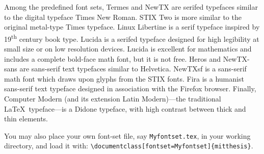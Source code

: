 \documentclass[11pt]{article}
\begin{document}
Among the predefined font sets, Termes and NewTX are serifed typefaces similar to the digital typeface Times New Roman.  STIX Two is more similar to the original metal-type Times typeface. Linux Libertine is a serif typeface inspired by 19\textsuperscript{th} century book type. Lucida is a serifed typeface designed for high legibility at small size or on low resolution devices. Lucida is excellent for mathematics and includes a complete bold-face math font, but it is not free. Heros and NewTX-sans are sans-serif text typefaces similar to Helvetica. NewTXsf is a sans-serif math font which draws upon glyphs from the STIX fonts. Fira is a humanist sans-serif text typeface designed in association with the Firefox browser. Finally, Computer Modern (and its extension Latin Modern)---the traditional \LaTeX\ typeface---is a Didone typeface, with high contrast between thick and thin elements.   

You may also place your own font-set file, say \texttt{Myfontset.tex}, in your working directory, and load it with:
\verb|\documentclass[fontset=Myfontset]{mitthesis}|.
\end{document}
